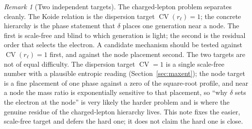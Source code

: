 \documentclass[11pt]{article}
\theoremstyle{definition}
\theoremstyle{remark}
\newtheorem{remark}{Remark}
\newcommand{\CV}{\operatorname{CV}}
\newcommand{\rl}{r_{\ell}}
\begin{document}
    \begin{remark}[Two independent targets]
      \label{rem:targets}
      The charged-lepton problem separates cleanly.
      The Koide relation is the dispersion target $\CV(\rl) = 1$; the concrete hierarchy is the phase statement
      that $\delta$ places one generation near a node.
      The first is scale-free and blind to which generation is light; the second is the residual order that
      selects the electron.
      A candidate mechanism should be tested against $\CV(\rl) = 1$ first, and against the node placement second.
      The two targets are not of equal difficulty.
      The dispersion target $\CV = 1$ is a single scale-free number with a plausible entropic reading
      (Section~\ref{sec:maxent}); the node target is a fine placement of one phase against a zero of the
      square-root profile, and near a node the mass ratio is exponentially sensitive to that placement, so
      ``why $\delta$ sets the electron at the node'' is very likely the harder problem and is where the genuine
      residue of the charged-lepton hierarchy lives.
      This note fixes the easier, scale-free target and defers the hard one; it does not claim the hard one is
      close.
    \end{remark}
\end{document}
